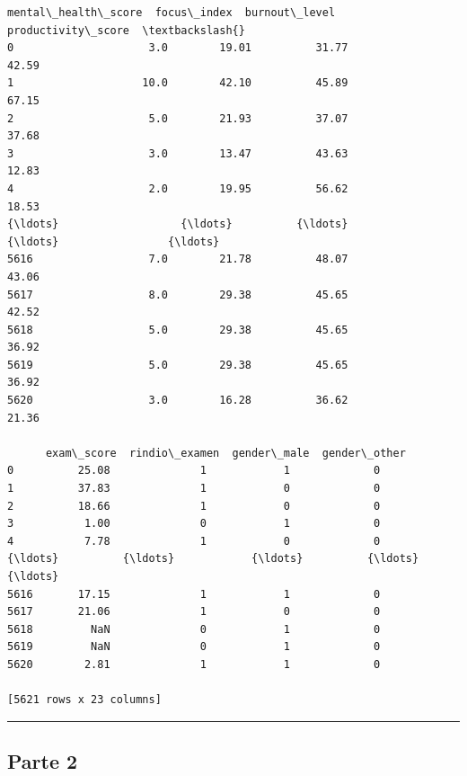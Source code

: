 \documentclass[11pt]{article}
\begin{document}
\begin{tcolorbox}[breakable, size=fbox, boxrule=.5pt, pad at break*=1mm, opacityfill=0]
\begin{Verbatim}[commandchars=\\\{\}]
      mental\_health\_score  focus\_index  burnout\_level  productivity\_score  \textbackslash{}
0                     3.0        19.01          31.77               42.59
1                    10.0        42.10          45.89               67.15
2                     5.0        21.93          37.07               37.68
3                     3.0        13.47          43.63               12.83
4                     2.0        19.95          56.62               18.53
{\ldots}                   {\ldots}          {\ldots}            {\ldots}                 {\ldots}
5616                  7.0        21.78          48.07               43.06
5617                  8.0        29.38          45.65               42.52
5618                  5.0        29.38          45.65               36.92
5619                  5.0        29.38          45.65               36.92
5620                  3.0        16.28          36.62               21.36

      exam\_score  rindio\_examen  gender\_male  gender\_other
0          25.08              1            1             0
1          37.83              1            0             0
2          18.66              1            0             0
3           1.00              0            1             0
4           7.78              1            0             0
{\ldots}          {\ldots}            {\ldots}          {\ldots}           {\ldots}
5616       17.15              1            1             0
5617       21.06              1            0             0
5618         NaN              0            1             0
5619         NaN              0            1             0
5620        2.81              1            1             0

[5621 rows x 23 columns]
\end{Verbatim}
\end{tcolorbox}
        
    \begin{center}\rule{0.5\linewidth}{0.5pt}\end{center}

\subsection{Parte 2}\label{parte-2}
\end{document}
